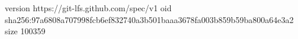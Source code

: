 version https://git-lfs.github.com/spec/v1
oid sha256:97a6808a707998fcb6ef832740a3b501baaa3678fa003b859b59ba800a64e3a2
size 100359
